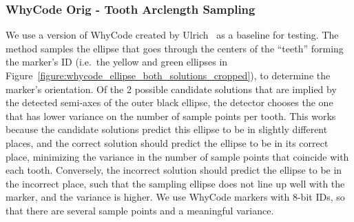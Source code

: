 \subsubsection{WhyCode Orig - Tooth Arclength Sampling}
\label{section:whycode_orig}
We use a version of WhyCode created by Ulrich~\cite{ulrich} as a baseline for testing.
The method samples the ellipse that goes through the centers of the ``teeth'' forming the marker's ID
(i.e.~the yellow and green ellipses in Figure~\ref{figure:whycode_ellipse_both_solutions_cropped}),
to determine the marker's orientation.
Of the 2 possible candidate solutions that are implied by the detected semi-axes of the outer black ellipse, the detector chooses the one that has lower variance on the number of sample points per tooth.
This works because the candidate solutions predict this ellipse to be in slightly different places,
and the correct solution should predict the ellipse to be in its correct place,
minimizing the variance in the number of sample points that coincide with each tooth.
Conversely, the incorrect solution should predict the ellipse to be in the incorrect place,
such that the sampling ellipse does not line up well with the marker, and the variance is higher.
We use WhyCode markers with 8-bit IDs, so that there are several sample points and a meaningful variance.

